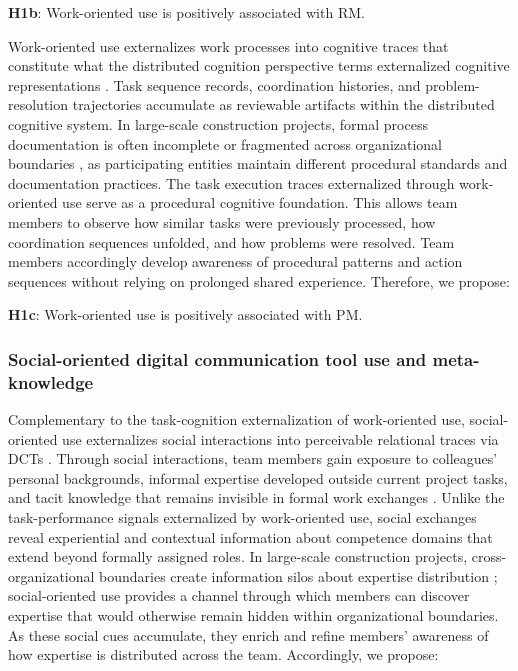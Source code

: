 \documentclass[authoryear,preprint,review,times,10pt]{elsarticle}
\begin{document}
\textbf{H1b}: Work-oriented use is positively associated with RM.

Work-oriented use externalizes work processes into cognitive traces that constitute what the distributed cognition perspective terms externalized cognitive representations \citep{faraj2000Coordinating}. Task sequence records, coordination histories, and problem-resolution trajectories accumulate as reviewable artifacts within the distributed cognitive system. In large-scale construction projects, formal process documentation is often incomplete or fragmented across organizational boundaries \citep{yang2025How}, as participating entities maintain different procedural standards and documentation practices. The task execution traces externalized through work-oriented use serve as a procedural cognitive foundation. This allows team members to observe how similar tasks were previously processed, how coordination sequences unfolded, and how problems were resolved. Team members accordingly develop awareness of procedural patterns and action sequences without relying on prolonged shared experience. Therefore, we propose:

\textbf{H1c}: Work-oriented use is positively associated with PM.

\subsubsection{Social-oriented digital communication tool use and meta-knowledge}
Complementary to the task-cognition externalization of work-oriented use, social-oriented use externalizes social interactions into perceivable relational traces via DCTs \citep{ali-hassan2015Linking, cao2019Exploring}. Through social interactions, team members gain exposure to colleagues' personal backgrounds, informal expertise developed outside current project tasks, and tacit knowledge that remains invisible in formal work exchanges \citep{ma2022Investigating}. Unlike the task-performance signals externalized by work-oriented use, social exchanges reveal experiential and contextual information about competence domains that extend beyond formally assigned roles. In large-scale construction projects, cross-organizational boundaries create information silos about expertise distribution \citep{shen2022Largescale}; social-oriented use provides a channel through which members can discover expertise that would otherwise remain hidden within organizational boundaries. As these social cues accumulate, they enrich and refine members' awareness of how expertise is distributed across the team. Accordingly, we propose:
\end{document}
